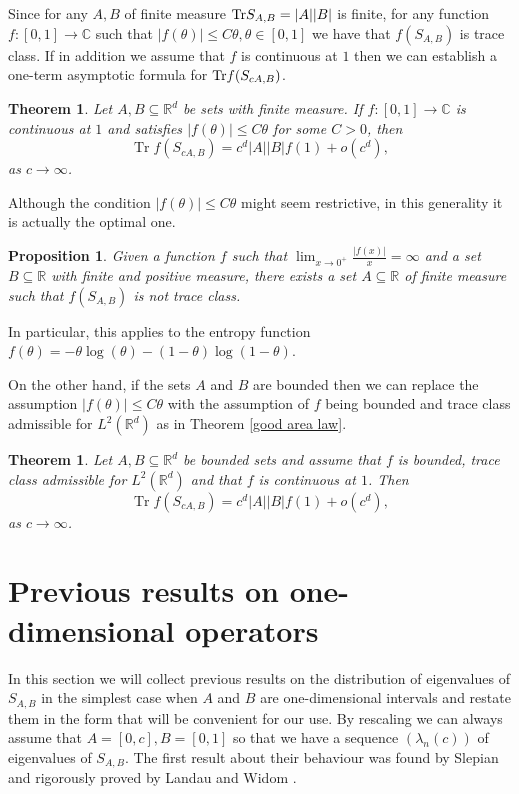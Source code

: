 \documentclass[12pt]{amsart}
\numberwithin{equation}{section}
\newcommand{\R}{\mathbb{R}}
\newcommand{\Cm}{\mathbb{C}}
\newtheorem{theorem}[Thm]{Theorem}
\newtheorem{proposition}[Thm]{Proposition}
\begin{document}
Since for any $A, B$ of finite measure ${\rm Tr}S_{A,B} = |A| |B|$ is finite, for any function $f:[0,1]\to\Cm$ such that $|f(\theta)|\le C\theta, \theta\in[0, 1]$ we have that $f(S_{A,B})$ is trace class. If in addition we assume that $f$ is continuous at $1$ then we can establish a one-term asymptotic formula for ${\rm Tr}f(S_{cA,B})$.


\begin{theorem}\label{one term general}
Let $A, B \subseteq \R^d$ be sets with finite measure. If $f:[0,1]\to \Cm$ is continuous at $1$ and satisfies $|f(\theta)| \leq C \theta$ for some $C>0$, then
\begin{equation}\label{one-term}
\operatorname{Tr} f(S_{cA,B}) = c^d|A||B| f(1) + o(c^{d}),
\end{equation}
as $c\to \infty$.
\end{theorem}
Although the condition $|f(\theta)|\leq C\theta$ might seem restrictive, in this generality it is actually the optimal one.
\begin{proposition}\label{one term counterexample}
Given a function $f$ such that $\lim_{x\to 0^+} \frac{|f(x)|}{x} = \infty$ and a set $B\subseteq \R$ with finite and positive measure, there exists a set $A\subseteq \R$ of finite measure such that $f(S_{A,B})$ is not trace class. 
\end{proposition}
In particular, this applies to the entropy function $f(\theta) = -\theta \log(\theta) - (1-\theta) \log(1-\theta)$.

On the other hand, if the sets $A$ and $B$ are bounded then we can replace the assumption $|f(\theta)|\le C\theta$ with the assumption of $f$ being bounded and  trace class admissible for $L^2(\R^d)$ as in Theorem \ref{good area law}.


\begin{theorem}\label{one term bounded}
Let $A, B \subseteq \R^d$ be bounded sets and assume that $f$ is bounded, trace class admissible for $L^2(\R^d)$ and that $f$ is continuous at $1$. Then 
\[
\operatorname{Tr} f(S_{cA, B}) = c^d|A||B| f(1) + o(c^{d}),
\]
as $c\to \infty$.
\end{theorem}






\section{Previous results on one-dimensional operators}
In this section we will collect previous results on the distribution of eigenvalues of $S_{A,B}$ in the simplest case when $A$ and $B$ are one-dimensional intervals and restate them in the form that will be convenient for our use. By rescaling we can always assume that $A = [0, c], B = [0, 1]$ so that we have a sequence $(\lambda_n(c))$ of eigenvalues of $S_{A,B}$. The first result about their behaviour was found by Slepian \cite{Slepain_65} and rigorously proved by Landau and Widom \cite{widom_landau}.
\end{document}
